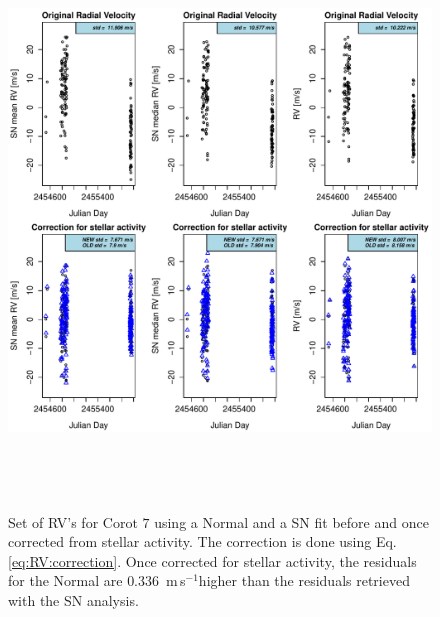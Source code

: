 \documentclass[11pt, oneside]{article}
\def\ms{\hbox{\,m\,s$^{-1}$}}         %
\begin{document}
\begin{figure} 
   \centering
\includegraphics[height = 6in]{NEW_CORRECTIONLRa01_E_[3]CorrectionActivity_RadialVelocity_vs_time.pdf} 
   \caption{Set of RV's for  $\text{Corot }7$ using a Normal and a SN fit before and once corrected from stellar activity. The correction is done using Eq. \ref{eq:RV:correction}. Once corrected for stellar activity, the residuals for the Normal are $0.336$ \ms higher than the residuals retrieved with the SN analysis.}
   \label{fig:Corot-7:correctionRV}
\end{figure}
\end{document}

